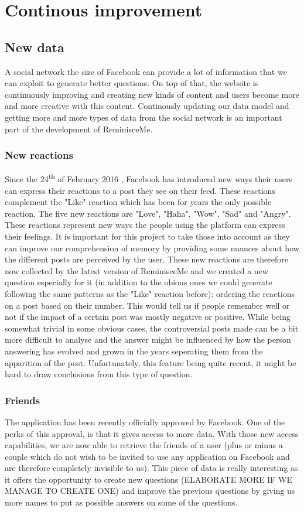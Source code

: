 \chapter{Continous improvement}
\section{New data}
A social network the size of Facebook can provide a lot of information that we can exploit to generate better questions. On top of that, the website is continuously improving and creating new kinds of content and users become more and more creative with this content. Continously updating our data model and getting more and more types of data from the social network is an important part of the development of ReminisceMe.
\subsection{New reactions}
Since the 24\textsuperscript{th} of February 2016 \cite{reactrelease}, Facebook has introduced new ways their users can express their reactions to a post they see on their feed. These reactions complement the "Like" reaction which has been for years the only possible reaction. The five new reactions are "Love", "Haha", "Wow", "Sad" and "Angry". These reactions represent new ways the people using the platform can express their feelings. It is important for this project to take those into account as they can improve our comprehension of memory by providing some nuances about how the different posts are perceived by the user. These new reactions are therefore now collected by the latest version of ReminisceMe and we created a new question especially for it (in addition to the obious ones we could generate following the same patterns as the "Like" reaction before): ordering the reactions on a post based on their number. This would tell us if people remember well or not if the impact of a certain post was mostly negative or positive. While being somewhat trivial in some obvious cases, the controversial posts made can be a bit more difficult to analyse and the answer might be influenced by how the person answering has evolved and grown in the years seperating them from the apparition of the post. Unfortunately, this feature being quite recent, it might be hard to draw conclusions from this type of question.
\subsection{Friends}
The application has been recently officially approved by Facebook. One of the perks of this approval, is that it gives access to more data. With those new access capabilities, we are now able to retrieve the friends of a user (plus or minus a couple which do not wish to be invited to use any application on Facebook and are therefore completely invisible to us). This piece of data is really interesting as it offers the opportunity to create new questions (ELABORATE MORE IF WE MANAGE TO CREATE ONE) and improve the previous questions by giving us more names to put as possible answers on some of the questions.
